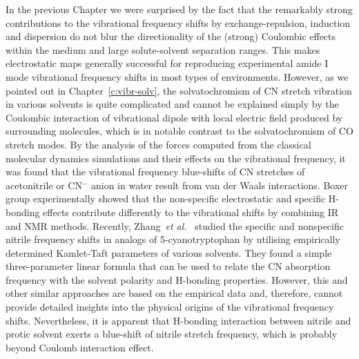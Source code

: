 \documentclass[a4paper,titlepage,twoside,fleqn,12pt]{book}
\begin{document}
\begin{refsection}
In the previous Chapter we were surprised by the fact that the remarkably strong
contributions to the vibrational frequency shifts by exchange\hyp{}repulsion,
induction and dispersion do not blur the directionality of the (strong)
Coulombic effects within the medium and large solute\hyp{}solvent separation ranges. 
This makes electrostatic maps generally successful for 
reproducing experimental amide I mode vibrational frequency shifts
in most types of environments. However, as we pointed out in Chapter~\ref{c:vibr-solv}, 
the solvatochromism of CN
stretch vibration in various solvents is quite complicated and
cannot be explained simply by the Coulombic interaction of
vibrational dipole with local electric field produced by
surrounding molecules, \citep{Ben-Amotz.Lee.Cho.List.JCP.1992,
Rey.Hynes.JCP.1998,
Reimers.Hall.JACS.1999,Fafarman.Sigala.Herschlag.Boxer.JACS.2010,
Morales.Thompson.JPCB.2011,
Wilderen.Luuk.Kern-Michler.Muller-Werkmeister.Bredenbeck.PCCP.2014}
%
which is in notable contrast to the
solvatochromism of CO stretch modes. \citep{Fried.Boxer.AccChemRes.2015,
Lee.Choi.Cho.JCP.2012,Fried.Bagchi.Boxer.JACS.2013}
%
By the analysis
of the forces computed from the classical molecular dynamics
simulations and their effects on the vibrational frequency, it
was found that the vibrational frequency blue\hyp{}shifts of CN
stretches of acetonitrile or CN$^-$ anion in water result from van
der Waals interactions. \citep{Rey.Hynes.JCP.1998,Morales.Thompson.JPCB.2011}
Boxer group experimentally showed that the non\hyp{}specific electrostatic and specific H-bonding
effects contribute differently to the vibrational shifts
by combining IR and NMR methods. \citep{Fafarman.Sigala.Herschlag.Boxer.JACS.2010,
Bagchi.Fried.Boxer.JACS.2012}
% 
Recently, Zhang~\emph{et al.}~\citep{Zhang.Markiewicz.Doerksen.Smith.Gai.PCCP.2015} 
studied
the specific and nonspecific nitrile frequency shifts in analogs
of 5-cyanotryptophan by utilising empirically determined
Kamlet\hyp{}Taft parameters \citep{Kamlet.Taft.JACS.1976,Taft.Kamlet.JACS.1976,
Kamlet.Abboud.Taft.JACS.1977}
%
of various solvents. They found a
simple three\hyp{}parameter linear formula that can be used to
relate the CN absorption frequency with the solvent polarity
and H-bonding properties. However, this and other similar
approaches \citep{Reimers.Hall.JACS.1999} 
are based on the empirical data and, therefore,
cannot provide detailed insights into the physical origins of the
vibrational frequency shifts. Nevertheless, it is apparent that
H-bonding interaction between nitrile and protic solvent exerts
a blue\hyp{}shift of nitrile stretch frequency, which is probably
beyond Coulomb interaction effect. 


\end{refsection}
\end{document}
